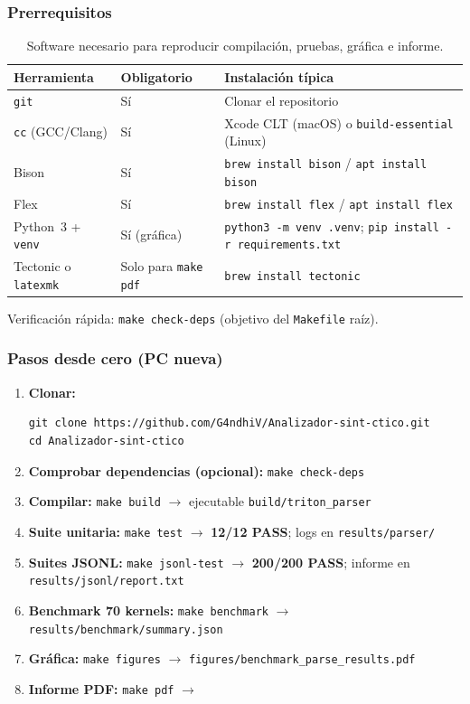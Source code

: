 \subsubsection{Prerrequisitos}
\begin{table}[H]
\centering
\caption{Software necesario para reproducir compilación, pruebas, gráfica e informe.}
\label{tab:repro-deps}
\small
\begin{tabular}{@{}llp{5.8cm}@{}}
\toprule
\textbf{Herramienta} & \textbf{Obligatorio} & \textbf{Instalación típica} \\
\midrule
\texttt{git} & Sí & Clonar el repositorio \\
\texttt{cc} (GCC/Clang) & Sí & Xcode CLT (macOS) o \texttt{build-essential} (Linux) \\
Bison & Sí & \texttt{brew install bison} / \texttt{apt install bison} \\
Flex & Sí & \texttt{brew install flex} / \texttt{apt install flex} \\
Python~3 + \texttt{venv} & Sí (gráfica) & \texttt{python3 -m venv .venv}; \texttt{pip install -r requirements.txt} \\
Tectonic o \texttt{latexmk} & Solo para \texttt{make pdf} & \texttt{brew install tectonic} \\
\bottomrule
\end{tabular}
\end{table}

Verificación rápida: \texttt{make check-deps} (objetivo del \texttt{Makefile} raíz).

\subsubsection{Pasos desde cero (PC nueva)}
\begin{enumerate}
  \item \textbf{Clonar:}
\begin{verbatim}
git clone https://github.com/G4ndhiV/Analizador-sint-ctico.git
cd Analizador-sint-ctico
\end{verbatim}
  \item \textbf{Comprobar dependencias (opcional):} \texttt{make check-deps}
  \item \textbf{Compilar:} \texttt{make build} $\rightarrow$ ejecutable \texttt{build/triton\_parser}
  \item \textbf{Suite unitaria:} \texttt{make test} $\rightarrow$ \textbf{12/12 PASS}; logs en \texttt{results/parser/}
  \item \textbf{Suites JSONL:} \texttt{make jsonl-test} $\rightarrow$ \textbf{200/200 PASS}; informe en \texttt{results/jsonl/report.txt}
  \item \textbf{Benchmark 70 kernels:} \texttt{make benchmark} $\rightarrow$ \texttt{results/benchmark/summary.json}
  \item \textbf{Gráfica:} \texttt{make figures} $\rightarrow$ \texttt{figures/benchmark\_parse\_results.pdf}
  \item \textbf{Informe PDF:} \texttt{make pdf} $\rightarrow$ 
\end{enumerate}

